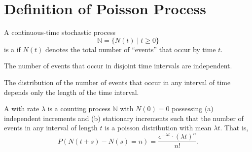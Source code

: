 \section{Definition of Poisson Process}

A continuous-time stochastic process
\[ \mathbb{N} = \{ N(t) \mid t \ge 0 \} \]
is a  if $ N(t) $ denotes the total number of ``events'' that occur by time $ t $.
\begin{comment}
$ N(t) $: non-negative integer, increases as $ t $ increases.
\end{comment}

\begin{definition}
The number of events that occur in disjoint time intervals are independent.
\end{definition}

\begin{definition}
The distribution of the number of events that occur in any interval of time depends only the length of the time interval.
\end{definition}

\begin{definition}
A  with rate $ \lambda $ is a counting process $ \mathbb{N} $ with $ N(0) = 0 $ possessing (a) independent increments and (b) stationary increments such that the number of events in any interval of length $ t $ is a poisson distribution with mean $ \lambda t $. That is,
\[ P(N(t + s) - N(s) = n) = \frac{e^{-\lambda t} \cdot (\lambda t)^{n}}{n!}. \]
\end{definition}

